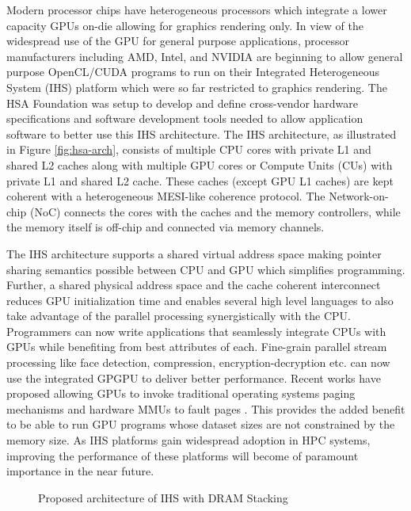 \par Modern processor chips have heterogeneous processors which integrate a lower capacity GPUs on-die allowing for graphics rendering only. In view of the widespread use of the GPU for general purpose applications, processor manufacturers including AMD\cite{amd-apu}, Intel\cite{inteliris}, and NVIDIA\cite{denver} are beginning to allow general purpose OpenCL\cite{opencl}/CUDA\cite{cuda} programs to run on their Integrated Heterogeneous System (IHS) platform which were so far restricted to graphics rendering. The HSA Foundation \cite{hsafoundation} was setup to develop and define cross-vendor hardware specifications and software development tools needed to allow application software to better use this IHS architecture. 
The IHS architecture, as illustrated in Figure \ref{fig:hsa-arch}, consists of multiple CPU cores with private L1 and shared L2 caches along with multiple GPU cores or Compute Units (CUs) with private L1 and shared L2 cache. These caches (except GPU L1 caches) are kept coherent with a heterogeneous MESI-like coherence protocol. The Network-on-chip (NoC) connects the cores with the caches and the memory controllers, while the memory itself is off-chip and connected via memory channels. 
\par The IHS architecture supports a shared virtual address space making pointer sharing semantics possible between CPU and GPU which simplifies programming. Further, a shared physical address space and the cache coherent interconnect reduces GPU initialization time and enables several high level languages \cite{sumatra,julia} to also take advantage of the parallel processing synergistically with the CPU. Programmers can now write applications that seamlessly integrate CPUs with GPUs while benefiting from best attributes of each. Fine-grain parallel stream processing like face detection, compression, encryption-decryption etc. can now use the integrated GPGPU to deliver better performance. Recent works have proposed allowing GPUs to invoke traditional operating systems paging mechanisms and hardware MMUs to fault pages \cite{tlb-translation}. This provides the added benefit to be able to run GPU programs whose dataset sizes are not constrained by the memory size. As IHS platforms gain widespread adoption in HPC systems, improving the performance of these platforms will become of paramount importance in the near future. \cite{apu-exascale,amd-exascale1}

\begin{figure}[!htb]
    \centering
    \def\svgwidth{\columnwidth}
    
    \caption{Proposed architecture of IHS with DRAM Stacking}
    \label{fig:stackdram}
\end{figure}

